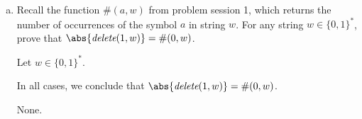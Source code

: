\documentclass[11pt]{article}
\def\Cdot{\mathbin{\text{\normalfont \textbullet}}}
\begin{document}
\begin{enumerate}[(a)]
\begin{Solution}
There are ?? cases to consider:
\begin{itemize}
\item
If $w = \e$, then
\begin{align*}
	\emph{delete}(a,x \Cdot y)
	&= \emph{delete}(a,\e \Cdot y)	& \text{because ?} \\
	&\\
	&\\
	&\\
	&\\
	&= \emph{delete}(a, \e) \Cdot \emph{delete}(a, y)	& \text{because ?} \\
	&= \emph{delete}(a, x) \Cdot \emph{delete}(a, y)	& \text{because $w = \e$} \\
\end{align*}
\item
...you fill in the rest of the cases
\end{itemize}
In all cases, we conclude that $\emph{delete}(a, x \Cdot y) = \emph{delete}(a, x) \Cdot \emph{delete}(a,y)$.
\end{Solution}
\unskip

\begin{Sources}~ %
\begin{itemize}
	\item Same ChatGPT conversation as above. Here is the full transcript of my conversation:\\
	 \url{https://chatgpt.com/share/6970e55f-e594-800e-88e3-c5eaa8caf7ce}

\end{itemize}
\end{Sources}

\newpage
\item Recall the function $\#(a, w)$ from problem session 1, which returns the number of occurrences of the symbol $a$ in string $w$. For any string $w \in \{0,1\}^*$, prove that $\abs{\emph{delete}(1,w)} = \#(0, w)$.

\begin{Solution}
\parindent0pt
Let $w \in \{0,1\}^* $.

\vspace{6in}

In all cases, we conclude that  $\abs{\emph{delete}(1,w)} = \#(0, w)$.
\end{Solution}

\begin{Sources}
None.
\end{Sources}


\end{enumerate}
\end{document}
